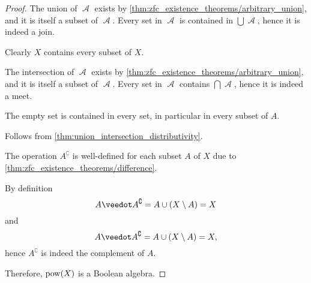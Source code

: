 \begin{proof}
   The union of \( \mscrA \) exists by \cref{thm:zfc_existence_theorems/arbitrary_union}, and it is itself a subset of \( \mscrA \). Every set in \( \mscrA \) is contained in \( \bigcup \mscrA \), hence it is indeed a join.

   Clearly \( X \) contains every subset of \( X \).

   The intersection of \( \mscrA \) exists by \cref{thm:zfc_existence_theorems/arbitrary_union}, and it is itself a subset of \( \mscrA \). Every set in \( \mscrA \) contains \( \bigcap \mscrA \), hence it is indeed a meet.

   The empty set is contained in every set, in particular in every subset of \( A \).

   Follows from \cref{thm:union_intersection_distributivity}.

   The operation \( A^\complement \) is well-defined for each subset \( A \) of \( X \) due to \cref{thm:zfc_existence_theorems/difference}.

  By definition
  \begin{equation*}
    A \synvee A^\complement
    =
    A \cup (X \setminus A)
    =
    X
  \end{equation*}
  and
  \begin{equation*}
    A \synvee A^\complement
    =
    A \cup (X \setminus A)
    =
    X,
  \end{equation*}
  hence \( A^\complement \) is indeed the complement of \( A \).

  Therefore, \( \operatorname{pow}(X) \) is a Boolean algebra.
\end{proof}

